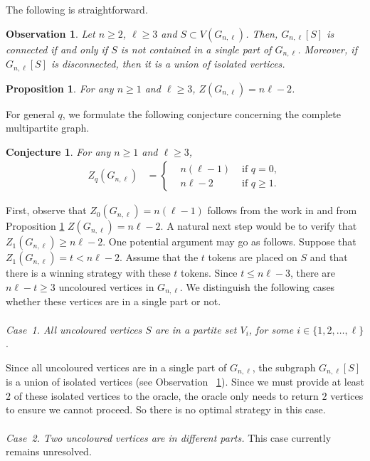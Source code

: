\documentclass[3p,times,12pt]{article}
\newtheorem{prop}[theorem]{Proposition}
\newtheorem{conj}[theorem]{Conjecture}
\newtheorem{obs}[theorem]{Observation}
\begin{document}
The following is straightforward.
\begin{obs}
		Let $n\geq 2$, $\ell \geq 3$ and $S\subset V(G_{n,\ell})$. Then, $G_{n,\ell}[S]$ is connected if and only if $S$ is not contained in a single part of $G_{n,\ell}$. Moreover, if $G_{n,\ell}[S]$ is disconnected, then it is a union of isolated vertices. \label{lem:cmp-connectedness}
	\end{obs}
	\begin{prop}\cite{AIM}
		For any $n\geq 1$ and $\ell \geq 3$, $Z(G_{n,\ell}) = n\ell -2$.\label{prop:cmp-zero-forcing}
	\end{prop}
	
	For general $q$, we formulate the following conjecture concerning the complete multipartite graph.
	
	\begin{conj}
		For any $n\geq 1$ and $\ell  \geq 3$, 
		\begin{align*}
			Z_q(G_{n,\ell})
			&=
			\left\{
				\begin{aligned}
					&n(\ell-1) &\mbox{ if }q=0,\\
					&n\ell -2 & \mbox{ if }q\geq 1.
				\end{aligned}
			\right.
		\end{align*}
		
	\end{conj} 
	 
	
	 	First, observe that $Z_0(G_{n,\ell}) = n(\ell-1)$ follows from the work in \cite{peters} and from Proposition \ref{prop:cmp-zero-forcing} $Z(G_{n,\ell})=n\ell -2$.
	 	A natural next step would be to verify that  $Z_1(G_{n,\ell}) \geq n\ell - 2$. One potential argument may go as follows. Suppose that $Z_1(G_{n,\ell}) = t <n\ell - 2$. Assume that the $t$ tokens are placed on $S$ and that there is a winning strategy with these $t$ tokens. Since $t\leq n\ell -3$, there are  $n\ell-t \geq 3$ uncoloured vertices in $G_{n,\ell}$. %
	 	We distinguish the following cases whether these vertices are in a single part or not.
	 	\\ \\
	 	{\it Case~1. All uncoloured vertices $S$ are in a partite set $V_i$, for some $i\in \{1,2,\ldots,\ell\}$}.
	 	
	 	Since all uncoloured vertices are in a single part of $G_{n,\ell}$, the subgraph $G_{n,\ell} \left[ S \right]$ is a union of isolated vertices (see Observation ~\ref{lem:cmp-connectedness}). Since we must provide at least $2$ of these isolated vertices to the oracle, the oracle only needs to return $2$ vertices to ensure we  cannot proceed. So there is no optimal strategy in this case.
	 	\\ \\
	 	{\it Case~2. Two uncoloured vertices are in different parts.} This case currently remains unresolved.
	 	
\end{document}

